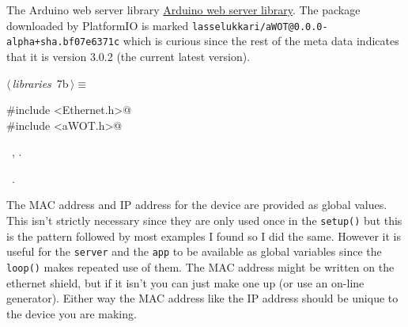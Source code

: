 \documentclass[a4paper, 11pt]{article}
\begin{document}
The Arduino web server library \href{https://github.com/lasselukkari/awot}{Arduino web server library}.
The package downloaded by PlatformIO is marked
\verb|lasselukkari/aWOT@0.0.0-alpha+sha.bf07e6371c|
which is curious since the rest of the meta data indicates that it is version 3.0.2
(the current latest version).

\begin{flushleft} \small
\begin{minipage}{\linewidth}\label{scrap7}\raggedright\small
{}$\langle\,${\itshape libraries}\nobreak\ {\footnotesize{7b}}$\,\rangle\equiv$
\vspace{-1ex}
\begin{list}{}{\setlength{\leftmargin}{1em}} \item
\mbox{}\lstinline@#include <Ethernet.h>@\\
\mbox{}\lstinline@#include <aWOT.h>@\\
\mbox{}{\NWsep}
\end{list}
\vspace{-1ex}
\vspace{-1ex}
\footnotesize
\begin{list}{}{\setlength{\itemsep}{-\parsep}\setlength{\itemindent}{-\leftmargin}}
\item \NWtxtMacroDefBy\ , .
\item \NWtxtMacroRefIn\ .
\end{list}
\end{minipage}
\end{flushleft}

The MAC address and IP address for the device
are provided as global values.
This isn't strictly necessary since they are only used once in the \verb|setup()|
but this is the pattern followed by most examples I found so I did the same.
However it is useful for the \verb|server| and the \verb|app| to be available
as global variables since the \verb|loop()| makes repeated use of them.
The MAC address might be written on the ethernet shield,
but if it isn't you can just make one up (or use an on-line generator).
Either way the MAC address like the IP address
should be unique to the device you are making.
\end{document}
